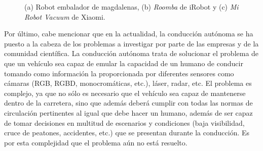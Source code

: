 \begin{figure}
	\begin{center}
		\hspace{0.1cm}
		\hspace{0.1cm}
	\end{center}
	\centering
	\captionsetup{justification=centering,margin=2cm}
	\caption{(a) Robot embalador de magdalenas, (b) \textit{Roomba} de iRobot y (c) \textit{Mi Robot Vacuum} de Xiaomi.}
	\label{fig:robots3}
\end{figure}

Por último, cabe mencionar que en la actualidad, la conducción autónoma se ha puesto a la cabeza de los problemas a investigar por parte de las empresas y de la comunidad científica. La conducción autónoma trata de solucionar el problema de que un vehículo sea capaz de emular la capacidad de un humano de conducir tomando como información la proporcionada por diferentes sensores como cámaras (RGB, RGBD, monocromáticas, etc.), láser, radar, etc. El problema es complejo, ya que no sólo es necesario que el vehículo sea capaz de mantenerse dentro de la carretera, sino que además deberá cumplir con todas las normas de circulación pertinentes al igual que debe hacer un humano, además de ser capaz de tomar decisiones en multitud de escenarios y condiciones (baja visibilidad, cruce de peatones, accidentes, etc.) que se presentan durante la conducción. Es por esta complejidad que el problema aún no está resuelto.

